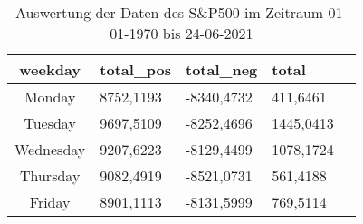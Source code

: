 \begin{table}[hbt]
    \centering
    \begin{minipage}[t]{1\textwidth} %
        \caption{Auswertung der Daten des S\&P500 im Zeitraum 01-01-1970 bis 24-06-2021} %
        \begin{tabularx}{\columnwidth}{ |c|X|X|X|X| }
            \hline
            \textbf{weekday} & \textbf{total\_pos} & \textbf{total\_neg} & \textbf{total} \\ \hline
            Monday           & 8752,1193           & -8340,4732          & 411,6461       \\ \hline
            Tuesday          & 9697,5109           & -8252,4696          & 1445,0413      \\ \hline
            Wednesday        & 9207,6223           & -8129,4499          & 1078,1724      \\ \hline
            Thursday         & 9082,4919           & -8521,0731          & 561,4188       \\ \hline
            Friday           & 8901,1113           & -8131,5999          & 769,5114       \\ \hline
        \end{tabularx}
        \label{tab:ausw_sp500}
    \end{minipage}
\end{table}

\clearpage